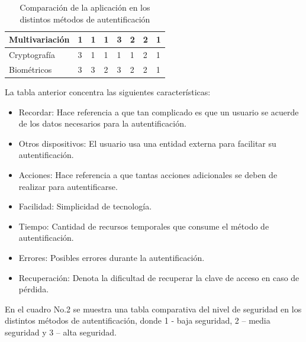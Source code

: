 \documentclass[12pt, a4paper, titlepage]{article}
\begin{document}
\begin{table}[htb]
{\begin{tabular}{l|l|l|l|l|l|l|l|}
					\multicolumn{1}{|l|}{Multivariación}                                                   & 1        & 1                                                            & 1        & 3         & 2      & 2       & 1            \\ \hline
					\multicolumn{1}{|l|}{Cryptografía}                                                     & 3        & 1                                                            & 1        & 1         & 1      & 2       & 1            \\ \hline
					\multicolumn{1}{|l|}{Biométricos}                                                      & 3        & 3                                                            & 2        & 3         & 2      & 2       & 1            \\ \hline
				\end{tabular}
			}
			\caption{Comparación de la aplicación en los distintos métodos de autentificación}
		\end{table}
		La tabla anterior concentra las siguientes características:
		
		\begin{itemize}
			\item Recordar: Hace referencia a que tan complicado es que un usuario se acuerde de los datos necesarios para la autentificación. 
			\item Otros dispositivos: El usuario usa una entidad externa para facilitar su autentificación.
			\item Acciones: Hace referencia a que tantas acciones adicionales se deben de realizar para autentificarse.
			\item Facilidad: Simplicidad de tecnología.
			\item Tiempo: Cantidad de recursos temporales que consume el método de autentificación.
			\item Errores: Posibles errores durante la autentificación. 
			\item Recuperación: Denota la dificultad de recuperar la clave de acceso en caso de pérdida.
		\end{itemize}
		
		En el cuadro No.2 se muestra una tabla comparativa del nivel de seguridad en los distintos métodos de autentificación, donde 1 - baja seguridad, 2 – media seguridad y 3 – alta seguridad.
		
\end{document}
